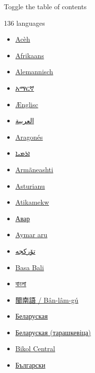 \documentclass[11pt,a4paper]{article}
\begin{document}
Toggle the table of contents

136 languages

\begin{itemize}
\item \href{https://ace.wikipedia.org/wiki/It\%C3\%A9k}{Acèh}
\item \href{https://af.wikipedia.org/wiki/Eend}{Afrikaans}
\item \href{https://als.wikipedia.org/wiki/Ente}{Alemannisch}
\item \href{https://am.wikipedia.org/wiki/\%E1\%8B\%B3\%E1\%8A\%AD\%E1\%8B\%AC}{አማርኛ}
\item \href{https://ang.wikipedia.org/wiki/Ened}{Ænglisc}
\item \href{https://ar.wikipedia.org/wiki/\%D8\%A8\%D8\%B7}{العربية}
\item \href{https://an.wikipedia.org/wiki/Anade}{Aragonés}
\item \href{https://arc.wikipedia.org/wiki/\%DC\%92\%DC\%9B\%DC\%90}{ܐܪܡܝܐ}
\item \href{https://roa-rup.wikipedia.org/wiki/Paphi}{Armãneashti}
\item \href{https://ast.wikipedia.org/wiki/Cor\%C3\%ADu}{Asturianu}
\item \href{https://atj.wikipedia.org/wiki/Cicip}{Atikamekw}
\item \href{https://av.wikipedia.org/wiki/\%D0\%9E\%D1\%80\%D0\%B4\%D0\%B5\%D0\%BA}{Авар}
\item \href{https://ay.wikipedia.org/wiki/Unkalla}{Aymar aru}
\item \href{https://azb.wikipedia.org/wiki/\%D8\%A7\%D8\%A4\%D8\%B1\%D8\%AF\%DA\%A9}{تۆرکجه}
\item \href{https://ban.wikipedia.org/wiki/B\%C3\%A9b\%C3\%A9k}{Basa Bali}
\item \href{https://bn.wikipedia.org/wiki/\%E0\%A6\%B9\%E0\%A6\%BE\%E0\%A6\%81\%E0\%A6\%B8}{বাংলা}
\item \href{https://zh-min-nan.wikipedia.org/wiki/Ah}{閩南語 / Bân-lâm-gú}
\item \href{https://be.wikipedia.org/wiki/\%D0\%9A\%D0\%B0\%D1\%87\%D0\%BA\%D1\%96}{Беларуская}
\item \href{https://be-tarask.wikipedia.org/wiki/\%D0\%9A\%D0\%B0\%D1\%87\%D0\%BA\%D1\%96}{Беларуская (тарашкевіца)}
\item \href{https://bcl.wikipedia.org/wiki/Itik}{Bikol Central}
\item \href{https://bg.wikipedia.org/wiki/\%D0\%9F\%D0\%B0\%D1\%82\%D0\%B8\%D1\%86\%D0\%B0}{Български}

\end{itemize}
\end{document}
